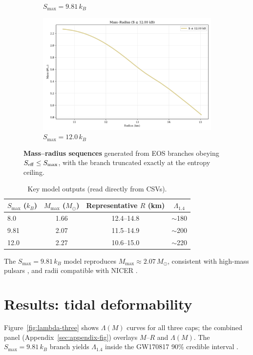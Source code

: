\documentclass[11pt]{article}
\begin{document}
\begin{figure}[h!]
\begin{subfigure}[t]{0.32\textwidth}
\caption{$S_{\max}=9.81\,k_B$}
\end{subfigure}\hfill
\begin{subfigure}[t]{0.32\textwidth}
\includegraphics[width=\textwidth]{mass_radius_curve_12.00kB.png}
\caption{$S_{\max}=12.0\,k_B$}
\end{subfigure}
\caption{\textbf{Mass--radius sequences} generated from EOS branches obeying $S_{\rm eff}\le S_{\max}$, with the branch truncated exactly at the entropy ceiling.}
\label{fig:mr}
\end{figure}

\begin{table}[h!]
\centering
\small
\caption{Key model outputs (read directly from CSVs).}
\label{tab:key}
\begin{tabular}{lccc}
\toprule
$S_{\max}$ ($k_B$) & $M_{\max}$ ($M_\odot$) & Representative $R$ (km) & $\Lambda_{1.4}$\\
\midrule
8.0  & 1.66 & 12.4--14.8 & $\sim$180 \\
9.81 & 2.07 & 11.5--14.9 & $\sim$200 \\
12.0 & 2.27 & 10.6--15.0 & $\sim$220 \\
\bottomrule
\end{tabular}
\end{table}

The $S_{\max}=9.81\,k_B$ model reproduces $M_{\max}\approx2.07\,M_\odot$, consistent with high-mass pulsars \cite{Demorest2010,Antoniadis2013,Cromartie2020}, and radii compatible with NICER \cite{Riley2019}.

\section{Results: tidal deformability}
\label{sec:lambda}
Figure~\ref{fig:lambda-three} shows $\Lambda(M)$ curves for all three caps; the combined panel (Appendix~\ref{sec:appendix-fig}) overlays $M$--$R$ and $\Lambda(M)$. The $S_{\max}=9.81\,k_B$ branch yields $\Lambda_{1.4}$ inside the GW170817 90\% credible interval \cite{Abbott2018GW170817}.
\end{document}
